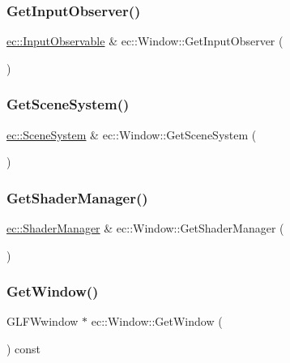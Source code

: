 \subsubsection{\texorpdfstring{Get\+Input\+Observer()}{GetInputObserver()}}
{\footnotesize\ttfamily \mbox{\hyperlink{classec_1_1_input_observable}{ec\+::\+Input\+Observable}} \& ec\+::\+Window\+::\+Get\+Input\+Observer (\begin{DoxyParamCaption}{ }\end{DoxyParamCaption})}

\mbox{\label{classec_1_1_window_aad83b5eb3bb0708c08503ac3c6b7b670}} 
\subsubsection{\texorpdfstring{Get\+Scene\+System()}{GetSceneSystem()}}
{\footnotesize\ttfamily \mbox{\hyperlink{classec_1_1_scene_system}{ec\+::\+Scene\+System}} \& ec\+::\+Window\+::\+Get\+Scene\+System (\begin{DoxyParamCaption}{ }\end{DoxyParamCaption})}

\mbox{\label{classec_1_1_window_a5f2d20a2d7b3bc05c29830164437d190}} 
\subsubsection{\texorpdfstring{Get\+Shader\+Manager()}{GetShaderManager()}}
{\footnotesize\ttfamily \mbox{\hyperlink{classec_1_1_shader_manager}{ec\+::\+Shader\+Manager}} \& ec\+::\+Window\+::\+Get\+Shader\+Manager (\begin{DoxyParamCaption}{ }\end{DoxyParamCaption})}

\mbox{\label{classec_1_1_window_a3131064635c5c422ac65b17eeaddae59}} 
\subsubsection{\texorpdfstring{Get\+Window()}{GetWindow()}}
{\footnotesize\ttfamily G\+L\+F\+Wwindow $\ast$ ec\+::\+Window\+::\+Get\+Window (\begin{DoxyParamCaption}{ }\end{DoxyParamCaption}) const}


